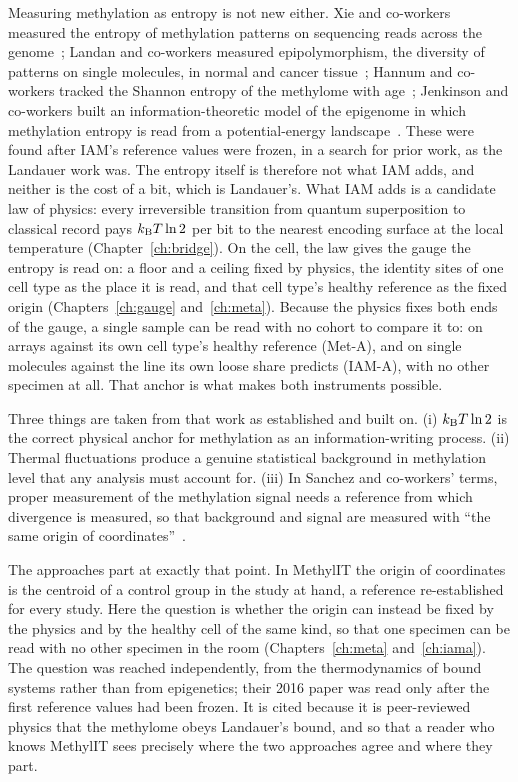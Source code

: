 Measuring methylation as entropy is not new either. Xie and co-workers measured the entropy of methylation patterns on sequencing reads
across the genome~\cite{Xie2011}; Landan and co-workers measured epipolymorphism, the diversity of patterns on single molecules, in normal
and cancer tissue~\cite{Landan2012}; Hannum and co-workers tracked the Shannon entropy of the methylome with age~\cite{Hannum2013};
Jenkinson and co-workers built an information-theoretic model of the epigenome in which methylation entropy is read from a potential-energy
landscape~\cite{Jenkinson2017}. These were found after IAM's reference values were frozen, in a search for prior work, as the Landauer work was. \observed{} The entropy itself is therefore not what IAM adds, and neither is the cost of a bit, which is Landauer's. What IAM adds is a
candidate law of physics: every irreversible transition from quantum superposition to classical record pays $k_{\mathrm B} T\ln2$ per bit to the
nearest encoding surface at the local temperature (Chapter~\ref{ch:bridge}). On the cell, the law gives the gauge the entropy is read
on: a floor and a ceiling fixed by physics, the identity sites of one cell type as the place it is read, and that cell type's healthy
reference as the fixed origin (Chapters~\ref{ch:gauge} and~\ref{ch:meta}). Because the physics fixes both ends of the gauge, a single sample can be read with no cohort to compare it to: on arrays against its own cell type's healthy reference (Met-A), and on single molecules against the line its own loose share predicts (IAM-A), with no other specimen at all. That anchor is what makes both instruments possible.

Three things are taken from that work as established and built on. (i) $k_{\mathrm B} T\ln2$ is the correct physical anchor for methylation as an
information-writing process. (ii) Thermal fluctuations produce a genuine statistical background in methylation level that any analysis must
account for. (iii) In Sanchez and co-workers' terms, proper measurement of the methylation signal needs a reference from which divergence is
measured, so that background and signal are measured with ``the same origin of coordinates''~\cite{Sanchez2019}.

The approaches part at exactly that point. In MethylIT the origin of coordinates is the centroid of a control group in the study at hand, a
reference re-established for every study. Here the question is whether the origin can instead be fixed by the physics and by the healthy cell of
the same kind, so that one specimen can be read with no other specimen in the room (Chapters~\ref{ch:meta} and~\ref{ch:iama}). The question was reached independently, from the thermodynamics of bound systems rather than from
epigenetics; their 2016 paper was read only after the first reference values had been frozen. It is cited because it is
peer-reviewed physics that the methylome obeys Landauer's bound, and so that a reader who knows MethylIT sees precisely where the two
approaches agree and where they part.

